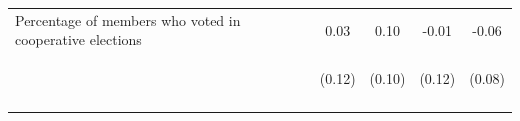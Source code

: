 \documentclass[11pt]{article}
\begin{document}
\begin{table}[H]
{\begin{tabularx}{1.3\linewidth}{lcccc}
\noalign{\smallskip}Percentage of members who voted in cooperative elections & 0.03 & 0.10 & -0.01 & -0.06\\
 & \begin{footnotesize}(0.12)\end{footnotesize} & \begin{footnotesize}(0.10)\end{footnotesize} & \begin{footnotesize}(0.12)\end{footnotesize} & \begin{footnotesize}(0.08)\end{footnotesize}\\
\noalign{\smallskip}\hline
  \end{tabularx}}
\end{table}
\doublespacing
\end{document}
